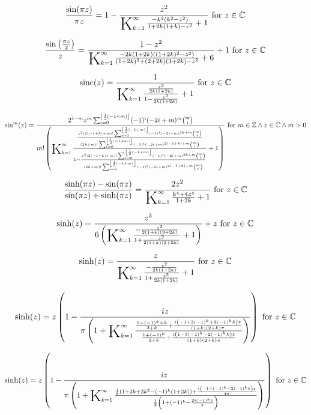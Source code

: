 \documentclass{article}
\newcommand{\bigK}{\mathop{\raisebox{-5pt}{\huge K}}}
\begin{document}
\[\frac{\sin (\pi  z)}{\pi  z}=1-\frac{z^2}{\bigK_{k=1}^{\infty}\frac{-k^2 \left(k^2-z^2\right)}{1+2 k (1+k)-z^2}+1}\text{ for }z\in \mathbb{C}\] 

\[\frac{\sin \left(\frac{\pi  z}{2}\right)}{z}=\frac{1-z^2}{\bigK_{k=1}^{\infty}\frac{-2 k (1+2 k) \left((1+2 k)^2-z^2\right)}{(1+2 k)^2+(2+2 k) (3+2 k)-z^2}+6}+1\text{ for }z\in \mathbb{C}\] 

\[\text{sinc}(z)=\frac{1}{\bigK_{k=1}^{\infty}\frac{\frac{z^2}{2 k (1+2 k)}}{1-\frac{z^2}{2 k (1+2 k)}}+1}\text{ for }z\in \mathbb{C}\] 

\[\sin ^m(z)=\frac{2^{1-m} z^m \sum _{i=0}^{\left\lfloor \frac{1}{2} (-1+m)\right\rfloor } (-1)^i (-2 i+m)^m \binom{m}{i}}{m! \left(\bigK_{k=1}^{\infty}\frac{\frac{z^2 (2 (-1+k)+m)! \sum _{i=0}^{\left\lfloor \frac{1}{2} (-1+m)\right\rfloor } (-1)^i (-2 i+m)^{2 k+m} \binom{m}{i}}{(2 k+m)! \sum _{i=0}^{\left\lfloor \frac{1}{2} (-1+m)\right\rfloor } (-1)^i (-2 i+m)^{2 (-1+k)+m} \binom{m}{i}}}{1-\frac{z^2 (2 (-1+k)+m)! \sum _{i=0}^{\left\lfloor \frac{1}{2} (-1+m)\right\rfloor } (-1)^i (-2 i+m)^{2 k+m} \binom{m}{i}}{(2 k+m)! \sum _{i=0}^{\left\lfloor \frac{1}{2} (-1+m)\right\rfloor } (-1)^i (-2 i+m)^{2 (-1+k)+m} \binom{m}{i}}}+1\right)}\text{ for }m\in \mathbb{Z}\land z\in \mathbb{C}\land m>0\] 

\[\frac{\sinh (\pi  z)-\sin (\pi  z)}{\sin (\pi  z)+\sinh (\pi  z)}=\frac{2 z^2}{\bigK_{k=1}^{\infty}\frac{k^4+4 z^4}{1+2 k}+1}\text{ for }z\in \mathbb{C}\] 

\[\sinh (z)=\frac{z^3}{6 \left(\bigK_{k=1}^{\infty}\frac{-\frac{z^2}{2 (1+k) (3+2 k)}}{1+\frac{z^2}{2 (1+k) (3+2 k)}}+1\right)}+z\text{ for }z\in \mathbb{C}\] 

\[\sinh (z)=\frac{z}{\bigK_{k=1}^{\infty}\frac{-\frac{z^2}{2 k (1+2 k)}}{1+\frac{z^2}{2 k (1+2 k)}}+1}\text{ for }z\in \mathbb{C}\] 

\[\sinh (z)=z \left(1-\frac{i z}{\pi  \left(1+\bigK_{k=1}^{\infty}\frac{\frac{1-(-1)^k+k}{2+k}+\frac{i \left(-1+3 (-1)^k+2 (-1)^k k\right) z}{(1+k) (2+k) \pi }}{\frac{1+(-1)^k}{2+k}+\frac{i \left(1-3 (-1)^k-2 (-1)^k k\right) z}{(1+k) (2+k) \pi }}\right)}\right)\text{ for }z\in \mathbb{C}\] 

\[\sinh (z)=z \left(1-\frac{i z}{\pi  \left(1+\bigK_{k=1}^{\infty}\frac{\frac{1}{8} \left(1+2 k+2 k^2-(-1)^k (1+2 k)\right)+\frac{i \left(-1+(-1)^k+2 (-1)^k k\right) z}{4 \pi }}{\frac{1}{2} \left(1+(-1)^k-\frac{2 i (-1)^k z}{\pi }\right)}\right)}\right)\text{ for }z\in \mathbb{C}\] 
\end{document}
